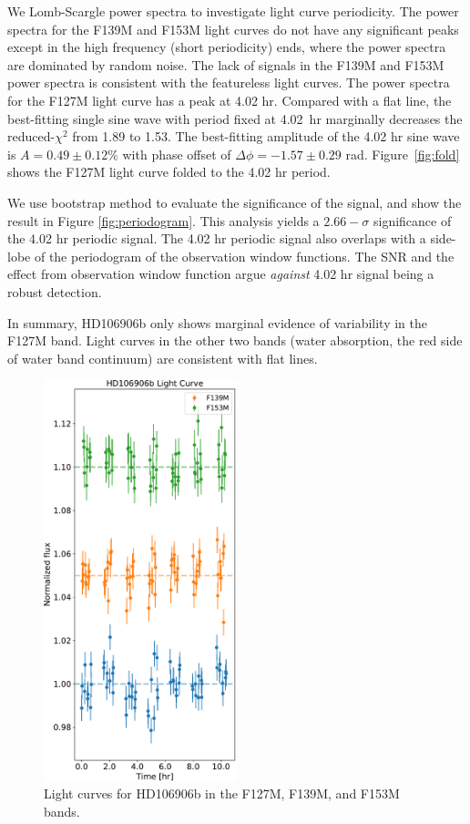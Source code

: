 \documentclass[twocolumn]{aastex62}
\begin{document}
We Lomb-Scargle power spectra \citep[][Figure~\ref{fig:periodogram}]{Lomb1976} to investigate light curve periodicity. The power spectra for the F139M and F153M light curves do not have any significant peaks except in the high frequency (short periodicity) ends, where the power spectra are dominated by random noise. The lack of signals in the F139M and F153M power spectra is consistent with the featureless light curves. The power spectra for the F127M light curve has a peak at 4.02 hr. Compared with a flat line, the best-fitting single sine wave with period fixed at 4.02~hr marginally decreases the reduced-$\chi^{2}$ from 1.89 to 1.53. The best-fitting amplitude of the 4.02 hr sine wave is $A = 0.49\pm0.12\%$ with phase offset of $\Delta \phi = -1.57\pm0.29$ rad. Figure~\ref{fig:fold} shows the F127M light curve folded to the 4.02 hr period.

We use bootstrap method\citep{Manjavacas2017,Zhou2019} to evaluate the significance of the signal, and show the result in Figure \ref{fig:periodogram}. This analysis yields a $2.66-\sigma$ significance of the 4.02 hr periodic signal. The 4.02 hr periodic signal also overlaps with a side-lobe of the periodogram of the observation window functions. The SNR and the effect from observation window function argue \emph{against} 4.02 hr signal being a robust detection.

In summary, HD106906b only shows marginal  evidence of variability in the F127M band. Light curves in the other two bands (water absorption, the red side of water band continuum) are consistent with flat lines.

\begin{figure}
  \centering
  \includegraphics[width=0.5\textwidth]{figures/HD106906_lightcurves.pdf}
  \caption{Light curves for HD106906b in the F127M, F139M, and F153M bands.}
  \label{fig:lightcurve}
\end{figure}
\end{document}
